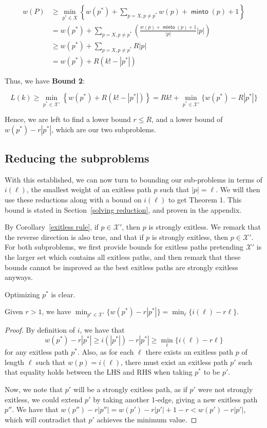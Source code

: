 \documentclass{article}
\DeclareMathOperator{\minto}{\bm{\mathsf{minto}}}
\newcommand{\edit}[1]{}%
\newcommand{\dc}[1]{}%
\begin{document}
\begin{align*}
    w(P)  &\geq \min_{p^* \in X}\left\{ w(p^*) + \sum_{p = X, p \neq p^*} w(p)+\minto(p)+1\right\}\\
    &= w(p^*) + \sum_{p = X, p \neq p^*} \left(\frac{w(p)+\minto(p)+1}{|p|}|p|\right)\\
    &\geq w(p^*) + \sum_{p = X, p \neq p^*} R |p|\\ 
    &= w(p^*) + R(k!-|p^*|)
\end{align*}

Thus, we have \textbf{Bound 2}:

\[ L(k) \geq \min_{p^* \in \mathcal{X}'}\left\{w(p^*) + R(k!-|p^*|) \right\} = Rk! + \min_{p^* \in \mathcal{X}'}\{w(p^*)-R|p^*|\} \]

Hence, we are left to find a lower bound $r \leq R$, and a lower bound of $w(p^*) - r|p^*|$, which are our two subproblems.

\subsection{Reducing the subproblems} \label{reducing subproblems}

With this established, we can now turn to bounding our sub-problems in terms of $i(\ell)$, the smallest weight of an exitless path $p$ such that $|p|= \ell$. We will then use these reductions along with a bound on $i(\ell)$ to get Theorem 1. This bound is stated in Section~\ref{solving reduction}, and proven in the appendix.\edit{ ref}

By Corollary~\ref{exitless rule}, if $p \in \mathcal{X}'$, then $p$ is strongly exitless. We remark that the reverse direction is also true, and that if $p$ is strongly exitless, then $p \in \mathcal{X}'$.\dc{ Just state that $\mathcal{X}'$ is exactly the set of strongly exitless paths, but do this in the previous section when you define $\mathcal{X}'$} For both subproblems, we first provide bounds for exitless paths pretending $\mathcal{X}'$ is the larger set which contains all exitless paths, and then remark that these bounds cannot be improved as the best exitless paths are strongly exitless anyways.


\vspace{.75em}
Optimizing $p^*$ is clear.
\begin{red} Given $r > 1$, we have $\min_{p^* \in \mathcal{X}'}\{w(p^*)-r|p^*|\} = \min_{\ell}\{i(\ell)-r\ell\}$.
\begin{proof}
By definition of $i$, we have that \[w(p^*)-r|p^*| \geq i(|p^*|)-r|p^*| \geq \min_{\ell}\{i(\ell)-r\ell\}\] for any exitless path $p^*$. Also, as for each $\ell$ there exists an exitless path $p$ of length $\ell$ such that $w(p) = i(\ell)$, there must exist an exitless path $p'$ such that equality holds between the LHS and RHS when taking $p^*$ to be $p'$. 

Now, we note that $p'$ will be a strongly exitless path, as if $p'$ were not strongly exitless, we could extend $p'$ by taking another 1-edge, giving a new exitless path $p''$. We have that $w(p'') -r|p''| = w(p')-r|p'|+1-r<w(p')-r|p'|$, which will contradict that $p'$ achieves the minimum value.  \end{proof}\end{red}
\end{document}
